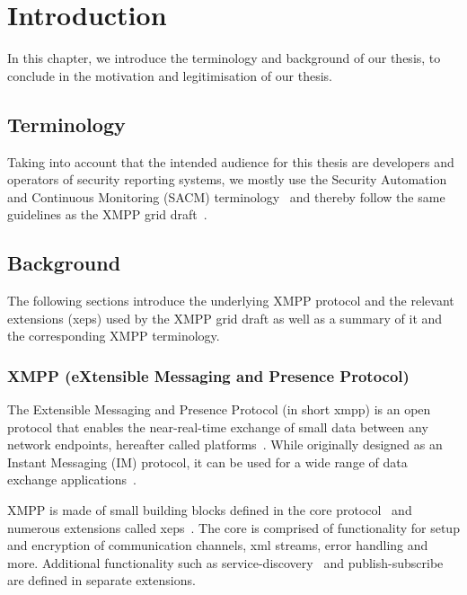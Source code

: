 \newcommand{\code}{\texttt}
\chapter{Introduction}
\label{sec:introduction}

In this chapter, we introduce the terminology and background of our thesis, to conclude in the motivation and legitimisation of our thesis.

\section{Terminology}
Taking into account that the intended audience for this thesis are developers and operators of security reporting systems, 
we mostly use the  Security Automation and Continuous Monitoring (SACM) terminology~\cite{ietf-sacm-terminology-14}
and thereby follow the same guidelines as the XMPP grid draft~\cite{ietf-mile-xmpp-grid-05}.

\section{Background}

The following sections introduce the underlying XMPP protocol and the relevant extensions (\glspl{xep}) used by the XMPP grid draft as well as a summary of it and the corresponding XMPP terminology.

\subsection{XMPP (eXtensible Messaging and Presence Protocol)}
The Extensible Messaging and Presence Protocol (in short \gls{xmpp}) is an open protocol that enables the near-real-time exchange of small data between any network endpoints, hereafter called \glspl{platform}~\cite{rfc6120}.
While originally designed as an Instant Messaging (IM) protocol, it can be used for a wide range of data exchange applications~\cite{ieee-xplore-stream-xml-xmpp}.

XMPP is made of small building blocks defined in the core protocol~\cite{rfc6120} and numerous extensions called \glspl{xep}~\cite{xep-0001}.
The core is comprised of functionality for setup and encryption of communication channels, \gls{xml} streams, error handling and more. Additional functionality such as \gls{service-discovery}~\cite{xep-0030} and \gls{publish-subscribe}~\cite{xep-0060} are defined in separate extensions.

